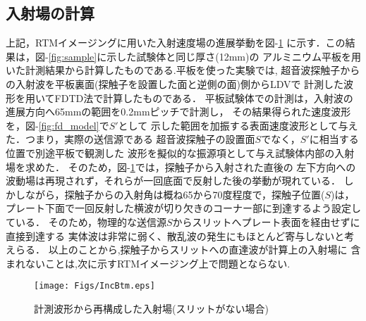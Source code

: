\subsection{入射場の計算}
上記，RTMイメージングに用いた入射速度場の進展挙動を{\rm 図}-\ref{fig:inc_btm}
に示す．この結果は，{\rm 図}-\ref{fig:sample}に示した試験体と同じ厚さ(12mm)の
アルミニウム平板を用いた計測結果から計算したものである.平板を使った実験では,
超音波探触子からの入射波を平板裏面(探触子を設置した面と逆側の面)側からLDVで
計測した波形を用いてFDTD法で計算したものである．
平板試験体での計測は，入射波の進展方向へ65mmの範囲を0.2mmピッチで計測し，
その結果得られた速度波形を，{\rm 図}-\ref{fig:fd_model}で$S'$として
示した範囲を加振する表面速度波形として与えた．つまり，実際の送信源である
超音波探触子の設置面$S$でなく，$S'$に相当する位置で別途平板で観測した
波形を擬似的な振源項として与え試験体内部の入射場を求めた．
そのため，{\rm 図}-\ref{fig:inc_btm}では，探触子から入射された直後の
左下方向への波動場は再現されず，それらが一回底面で反射した後の挙動が現れている． 
しかしながら，探触子からの入射角は概ね65から70度程度で，探触子位置($S$)は，
プレート下面で一回反射した横波が切り欠きのコーナー部に到達するよう設定している．
そのため，物理的な送信源$S$からスリットへプレート表面を経由せずに直接到達する
実体波は非常に弱く、散乱波の発生にもほとんど寄与しないと考えらる．
以上のことから,探触子からスリットへの直達波が計算上の入射場に
含まれないことは,次に示すRTMイメージング上で問題とならない.
\begin{figure}[htb]
\centering
	\texttt{[image: Figs/IncBtm.eps]}
	\caption{計測波形から再構成した入射場(スリットがない場合)}
	\label{fig:inc_btm}
\end{figure}
